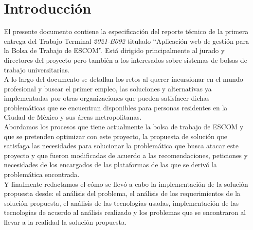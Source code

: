 \selectfont
\chapter{Introducción}
	El presente documento contiene la especificación del reporte técnico de la primera entrega del 
	Trabajo Terminal \textit{2021-B092} titulado ``Aplicación web de gestión para la Bolsa de
	Trabajo de ESCOM''. Está dirigido principalmente  al  jurado  y directores del proyecto pero también a  los interesados sobre sistemas de bolsas de trabajo universitarias.\\
	\newline
	A lo largo del documento se detallan los retos al querer incursionar en el mundo profesional y buscar el primer empleo, las soluciones y alternativas ya implementadas por otras organizaciones que pueden satisfacer dichas problemáticas que se encuentran disponibles para personas residentes en la Ciudad de México y sus áreas metropolitanas.\\
	Abordamos los procesos que tiene actualmente la bolsa de trabajo de ESCOM y que se pretenden optimizar con este proyecto, la propuesta de solución que satisfaga las necesidades para solucionar la problemática que busca atacar este proyecto y que fueron modificadas de acuerdo a las recomendaciones, peticiones y necesidades de los encargados de las plataformas de las que se derivó la problemática encontrada. \\
	Y finalmente redactamos el cómo se llevó a cabo la implementación de la solución propuesta desde: el análisis del problema, el análisis de los requerimientos de la solución propuesta, el análisis de las tecnologías usadas, implementación de las tecnologías de acuerdo al análisis realizado y los problemas que se encontraron al llevar a la realidad la solución propuesta.



